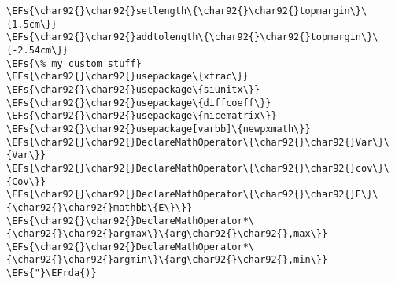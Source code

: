 \documentclass[c]{article}
\theoremstyle{plain}%
\theoremstyle{definition}
\theoremstyle{remark}
\newcommand{\EFs}[1]{\textcolor{EFs}{#1}} %
\newcommand{\EFrda}[1]{\textcolor{EFrda}{#1}} %
\begin{document}
\begin{enumerate}
\begin{Code}
\begin{Verbatim}
\EFs{\char92{}\char92{}setlength\{\char92{}\char92{}topmargin\}\{1.5cm\}}
\EFs{\char92{}\char92{}addtolength\{\char92{}\char92{}topmargin\}\{-2.54cm\}}
\EFs{\% my custom stuff}
\EFs{\char92{}\char92{}usepackage\{xfrac\}}
\EFs{\char92{}\char92{}usepackage\{siunitx\}}
\EFs{\char92{}\char92{}usepackage\{diffcoeff\}}
\EFs{\char92{}\char92{}usepackage\{nicematrix\}}
\EFs{\char92{}\char92{}usepackage[varbb]\{newpxmath\}}
\EFs{\char92{}\char92{}DeclareMathOperator\{\char92{}\char92{}Var\}\{Var\}}
\EFs{\char92{}\char92{}DeclareMathOperator\{\char92{}\char92{}cov\}\{Cov\}}
\EFs{\char92{}\char92{}DeclareMathOperator\{\char92{}\char92{}E\}\{\char92{}\char92{}mathbb\{E\}\}}
\EFs{\char92{}\char92{}DeclareMathOperator*\{\char92{}\char92{}argmax\}\{arg\char92{}\char92{},max\}}
\EFs{\char92{}\char92{}DeclareMathOperator*\{\char92{}\char92{}argmin\}\{arg\char92{}\char92{},min\}}
\EFs{"}\EFrda{)}
\end{Verbatim}
\end{Code}
\end{enumerate}
\end{document}
